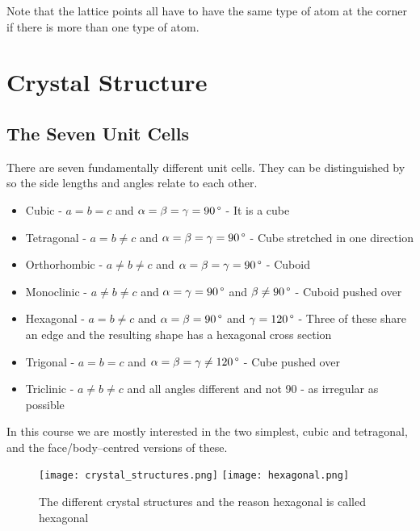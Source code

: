     Note that the lattice points all have to have the same type of atom at the corner if there is more than one type of atom.
    
    \section{Crystal Structure}
    \subsection{The Seven Unit Cells}
    There are seven fundamentally different unit cells.
    They can be distinguished by so the side lengths and angles relate to each other.
    \begin{itemize}
        \item Cubic - \(a = b = c\) and \(\alpha = \beta = \gamma = \SI{90}{\SIUnitSymbolDegree}\) - It is a cube
        \item Tetragonal - \(a = b \ne c\) and \(\alpha = \beta = \gamma = \SI{90}{\SIUnitSymbolDegree}\) - Cube stretched in one direction
        \item Orthorhombic - \(a \ne b \ne c\) and \(\alpha = \beta = \gamma = \SI{90}{\SIUnitSymbolDegree}\) - Cuboid
        \item Monoclinic - \(a \ne b \ne c\) and \(\alpha = \gamma = \SI{90}{\SIUnitSymbolDegree}\) and \(\beta \ne \SI{90}{\SIUnitSymbolDegree}\) - Cuboid pushed over
        \item Hexagonal - \(a = b \ne c\) and \(\alpha = \beta = \SI{90}{\SIUnitSymbolDegree}\) and \(\gamma = \SI{120}{\SIUnitSymbolDegree}\) - Three of these share an edge and the resulting shape has a hexagonal cross section
        \item Trigonal - \(a = b = c\) and \(\alpha = \beta = \gamma \ne \SI{120}{\SIUnitSymbolDegree}\) - Cube pushed over
        \item Triclinic - \(a \ne b \ne c\) and all angles different and not \SI{90}{\SIUnitSymbolDegree} - as irregular as possible
    \end{itemize}
    In this course we are mostly interested in the two simplest, cubic and tetragonal, and the face/body--centred versions of these.
    
    \begin{figure}[ht]
        \centering
        \texttt{[image: crystal\_structures.png]}
        \texttt{[image: hexagonal.png]}
        \caption{The different crystal structures and the reason hexagonal is called hexagonal}
    \end{figure}
    
